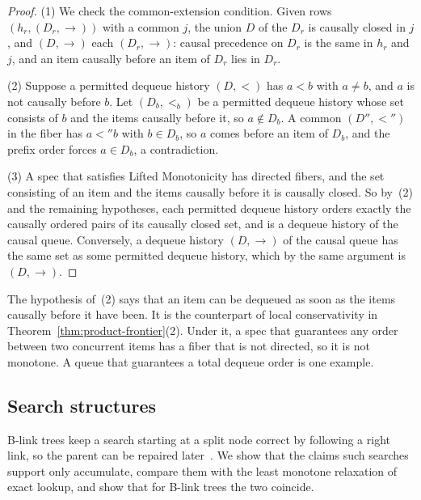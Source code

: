 \begin{proof}
(1) We check the common-extension condition.  Given rows $(h_r,(D_r,\to))$
with a common \indesc $j$, the union $D$ of the $D_r$ is causally closed in
$j$, and $(D,\to)$ \outrel each $(D_r,\to)$: causal precedence on $D_r$ is the
same in $h_r$ and $j$, and an item causally before an item of $D_r$ lies in
$D_r$.

(2) Suppose a permitted dequeue history $(D,<)$ has $a<b$ with $a\neq b$, and
$a$ is not causally before $b$.  Let $(D_b,<_b)$ be a permitted dequeue history
whose set consists of $b$ and the items causally before it, so
$a\notin D_b$.  A common \outnoun $(D'',<'')$ in the fiber has $a<''b$ with
$b\in D_b$, so $a$ comes before an item of $D_b$, and the prefix order forces
$a\in D_b$, a contradiction.

(3) A spec that satisfies Lifted Monotonicity has directed fibers, and the set
consisting of an item and the items causally before it is causally closed.
So by~(2) and the remaining hypotheses, each permitted dequeue history orders
exactly the causally ordered pairs of its causally closed set, and is a dequeue
history of the causal queue.  Conversely, a dequeue history $(D,\to)$ of the
causal queue has the same set as some permitted dequeue history, which by the
same argument is $(D,\to)$.
\end{proof}

The hypothesis of~(2) says that an item can be dequeued as soon as the items
causally before it have been.  It is the counterpart of local conservativity
in Theorem~\ref{thm:product-frontier}(2).  Under it, a spec that guarantees any
order between two concurrent items has a fiber that is not directed, so it is
not monotone.  A queue that guarantees a total dequeue order is one example.

\subsection{Search structures}
\label{app:search}

B-link trees keep a search starting at a split node correct by following a
right link, so the parent can be repaired later~\cite{lehman1981efficient}.  We
show that the claims such searches support only accumulate, compare them with
the least monotone relaxation of exact lookup, and show that for B-link trees
the two coincide.

